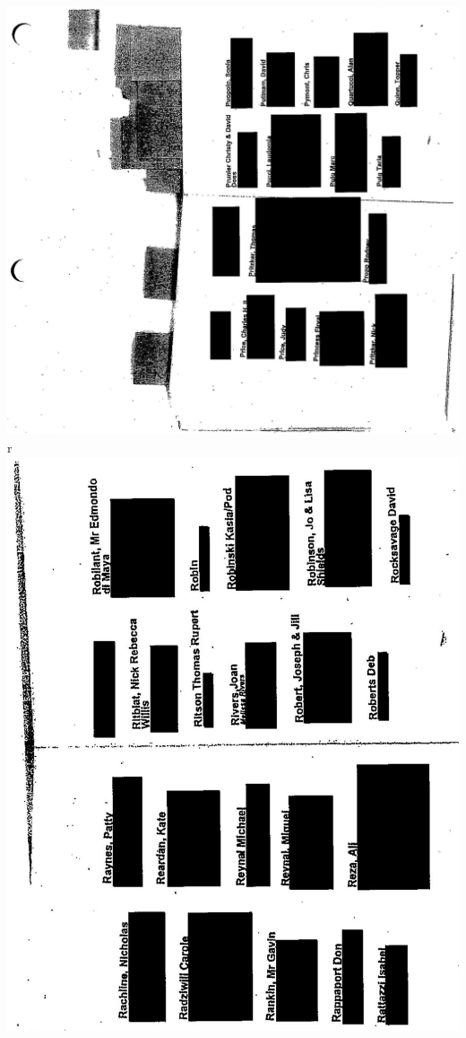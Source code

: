 \documentclass[10pt]{article}
\begin{document}
\includegraphics[max width=\textwidth, center]{2025_02_27_dd68c3d38de88f0516d9g-167}\\
r\\
\includegraphics[max width=\textwidth, center]{2025_02_27_dd68c3d38de88f0516d9g-168}\\
\end{document}

